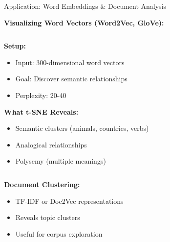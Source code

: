 \documentclass[10pt]{beamer}
\begin{document}
\begin{frame}{Application: Word Embeddings \& Document Analysis}

\textbf{Visualizing Word Vectors (Word2Vec, GloVe):}

\vspace{0.2cm}
\begin{columns}
\begin{column}{0.5\textwidth}
\textbf{Setup:}
\begin{itemize}
    \setlength\itemsep{0em}
    \item Input: 300-dimensional word vectors
    \item Goal: Discover semantic relationships
    \item Perplexity: 20-40
\end{itemize}

\vspace{0.2cm}
\textbf{What t-SNE Reveals:}
\begin{itemize}
    \setlength\itemsep{0em}
    \item Semantic clusters (animals, countries, verbs)
    \item Analogical relationships
    \item Polysemy (multiple meanings)
\end{itemize}
\end{column}
\begin{column}{0.5\textwidth}
\end{column}
\end{columns}

\vspace{0.2cm}
\textbf{Document Clustering:}
\begin{itemize}
    \setlength\itemsep{0em}
    \item TF-IDF or Doc2Vec representations
    \item Reveals topic clusters
    \item Useful for corpus exploration
\end{itemize}


\end{frame}
\end{document}
